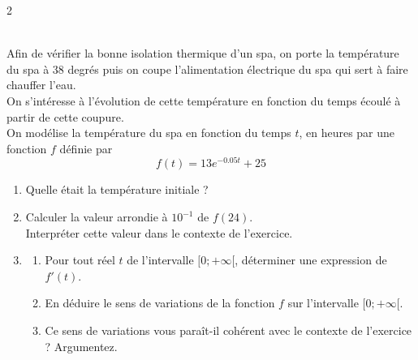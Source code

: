 \documentclass[10pt,a4paper]{article}
\begin{document}
\begin{multicols}{2}
\begin{exo}\\
Afin de vérifier la bonne isolation thermique d'un spa, on porte la température du spa à 38 degrés puis on coupe l'alimentation électrique du spa qui sert à faire chauffer l'eau. \\
On s'intéresse à l'évolution de cette température en fonction du temps écoulé à partir de cette coupure. \\
On modélise la température du spa en fonction du temps $t$, en heures par une fonction $f$ définie par $$
f(t) = 13e^{-0.05t}+25
$$
\begin{enumerate}
\item Quelle était la température initiale ?
\item Calculer la valeur arrondie à $10^{-1}$ de $f(24)$.\\
Interpréter cette valeur dans le contexte de l'exercice.
\item \begin{enumerate}
\item Pour tout réel $t$ de l'intervalle $[0;+\infty[$, déterminer une expression de $f'(t)$. 
\item En déduire le sens de variations de la fonction $f$ sur l'intervalle $[0;+\infty[$.
\item Ce sens de variations vous paraît-il cohérent avec le contexte de l'exercice ? Argumentez.
\end{enumerate}
\end{enumerate}
\end{exo}


\end{multicols}
\end{document}
